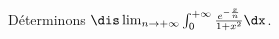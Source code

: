 \documentclass[a4paper,10pt]{report}
\begin{document}
\begin{ex} Déterminons $\dis \lim_{n \rightarrow + \infty} \int_{0}^{+ \infty} \frac{e^{- \frac{x}{n}}}{1+x^2} \dx$.

%
%

\vspace{11.5cm}
\end{ex}

%
%
\end{document}
